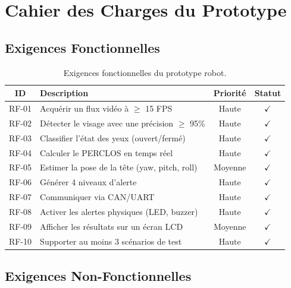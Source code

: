 \documentclass[12pt,a4paper,twoside]{report}
\begin{document}
\section{Cahier des Charges du Prototype}

\subsection{Exigences Fonctionnelles}

\begin{table}[H]
\centering
\caption{Exigences fonctionnelles du prototype robot.}
\label{tab:req_fonctionnelles}
\renewcommand{\arraystretch}{1.4}
\begin{tabularx}{\textwidth}{|c|X|c|c|}
\hline
\rowcolor{stellantisblue!15}
\textbf{ID} & \textbf{Description} & \textbf{Priorité} & \textbf{Statut} \\
\hline
RF-01 & Acquérir un flux vidéo à $\geq$ 15 FPS & Haute & $\checkmark$ \\
\hline
RF-02 & Détecter le visage avec une précision $\geq$ 95\% & Haute & $\checkmark$ \\
\hline
RF-03 & Classifier l'état des yeux (ouvert/fermé) & Haute & $\checkmark$ \\
\hline
RF-04 & Calculer le PERCLOS en temps réel & Haute & $\checkmark$ \\
\hline
RF-05 & Estimer la pose de la tête (yaw, pitch, roll) & Moyenne & $\checkmark$ \\
\hline
RF-06 & Générer 4 niveaux d'alerte & Haute & $\checkmark$ \\
\hline
RF-07 & Communiquer via CAN/UART & Haute & $\checkmark$ \\
\hline
RF-08 & Activer les alertes physiques (LED, buzzer) & Haute & $\checkmark$ \\
\hline
RF-09 & Afficher les résultats sur un écran LCD & Moyenne & $\checkmark$ \\
\hline
RF-10 & Supporter au moins 3 scénarios de test & Haute & $\checkmark$ \\
\hline
\end{tabularx}
\end{table}

\subsection{Exigences Non-Fonctionnelles}
\end{document}
